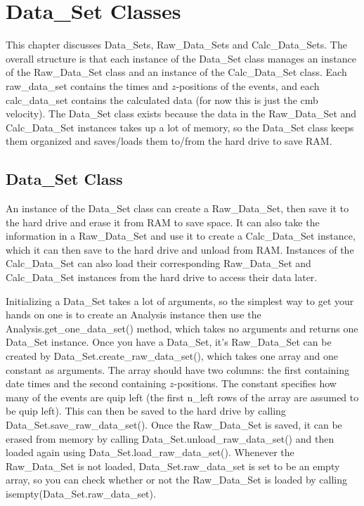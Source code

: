 \documentclass[12pt]{report}
\begin{document}
\chapter{Data\_Set Classes}
\label{chap:DataSet}
This chapter discusses Data\_Sets, Raw\_Data\_Sets and Calc\_Data\_Sets.  The overall structure is that each instance of the Data\_Set class manages an instance of the Raw\_Data\_Set class and an instance of the Calc\_Data\_Set class.  Each raw\_data\_set contains the times and $z$-positions of the events, and each calc\_data\_set contains the calculated data (for now this is just the cmb velocity).  The Data\_Set class exists because the data in the Raw\_Data\_Set and Calc\_Data\_Set instances takes up a lot of memory, so the Data\_Set class keeps them organized and saves/loads them to/from the hard drive to save RAM.

\section{Data\_Set Class}
An instance of the Data\_Set class can create a Raw\_Data\_Set, then save it to the hard drive and erase it from RAM to save space.  It can also take the information in a Raw\_Data\_Set and use it to create a Calc\_Data\_Set instance, which it can then save to the hard drive and unload from RAM.  Instances of the Calc\_Data\_Set can also load their corresponding Raw\_Data\_Set and Calc\_Data\_Set instances from the hard drive to access their data later.

Initializing a Data\_Set takes a lot of arguments, so the simplest way to get your hands on one is to create an Analysis instance then use the Analysis.get\_one\_data\_set() method, which takes no arguments and returns one Data\_Set instance.  Once you have a Data\_Set, it's Raw\_Data\_Set can be created by Data\_Set.create\_raw\_data\_set(), which takes one array  and one constant as arguments.  The array should have two columns: the first containing date times and the second containing $z$-positions.  The constant specifies how many of the events are quip left (the first n\_left rows of the array are assumed to be quip left).  This can then be saved to the hard drive by calling Data\_Set.save\_raw\_data\_set().  Once the Raw\_Data\_Set is saved, it can be erased from memory by calling Data\_Set.unload\_raw\_data\_set() and then loaded again using Data\_Set.load\_raw\_data\_set().  Whenever the Raw\_Data\_Set is not loaded, Data\_Set.raw\_data\_set is set to be an empty array, so you can check whether or not the Raw\_Data\_Set is loaded by calling isempty(Data\_Set.raw\_data\_set).
\end{document}
